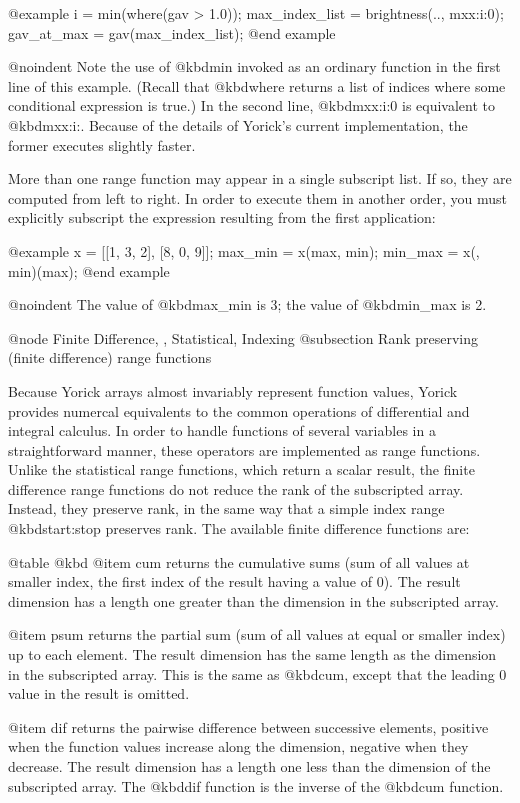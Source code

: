 @example
i = min(where(gav > 1.0));
max_index_list = brightness(.., mxx:i:0);
gav_at_max = gav(max_index_list);
@end example

@noindent
Note the use of @kbd{min} invoked as an ordinary function in the first
line of this example.  (Recall that @kbd{where} returns a list of
indices where some conditional expression is true.)  In the second line,
@kbd{mxx:i:0} is equivalent to @kbd{mxx:i:}.  Because of the details of
Yorick's current implementation, the former executes slightly faster.


More than one range function may appear in a single subscript list.  If
so, they are computed from left to right.  In order to execute them in
another order, you must explicitly subscript the expression resulting
from the first application:

@example
x = [[1, 3, 2], [8, 0, 9]];
max_min = x(max, min);
min_max = x(, min)(max);
@end example

@noindent
The value of @kbd{max_min} is 3; the value of @kbd{min_max} is 2.



@node    Finite Difference,  , Statistical, Indexing
@subsection Rank preserving (finite difference) range functions

Because Yorick arrays almost invariably represent function values,
Yorick provides numercal equivalents to the common operations of
differential and integral calculus.  In order to handle functions of
several variables in a straightforward manner, these operators are
implemented as range functions.  Unlike the statistical range functions,
which return a scalar result, the finite difference range functions do
not reduce the rank of the subscripted array.  Instead, they preserve
rank, in the same way that a simple index range @kbd{start:stop}
preserves rank.  The available finite difference functions are:


@table @kbd
@item cum
returns the cumulative sums (sum of all values at smaller index, the
first index of the result having a value of 0).  The result dimension
has a length one greater than the dimension in the subscripted array.

@item psum
returns the partial sum (sum of all values at equal or smaller index)
up to each element.  The result dimension has the same length as the
dimension in the subscripted array.  This is the same as @kbd{cum},
except that the leading 0 value in the result is omitted.

@item dif
returns the pairwise difference between successive elements, positive
when the function values increase along the dimension, negative when
they decrease.  The result dimension has a length one less than the
dimension of the subscripted array.  The @kbd{dif} function is the
inverse of the @kbd{cum} function.

